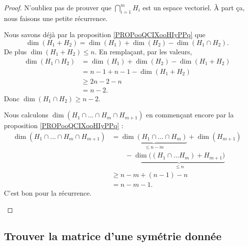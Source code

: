 \begin{proof}
	N'oubliez pas de prouver que \( \bigcap_{i=1}^mH_i\) est un espace vectoriel. À part ça, nous faisons une petite récurrence.
	\begin{subproof}
		\spitem[Pour \( m=2\)]
		Nous savons déjà par la proposition \ref{PROPooQCIXooHIyPPq} que
		\begin{equation}
			\dim(H_1 + H_2)=\dim(H_1)+\dim(H_2)-\dim(H_1\cap H_2).
		\end{equation}
		De plus \( \dim(H_1+H_2)\leq n\). En remplaçant, par les valeurs,
		\begin{subequations}
			\begin{align}
				\dim(H_1\cap H_2) & =\dim(H_1)+\dim(H_2)-\dim(H_1+ H_2) \\
				                  & =n-1+n-1-\dim(H_1+H_2)              \\
				                  & \geq 2n-2-n                         \\
				                  & =n-2.
			\end{align}
		\end{subequations}
		Donc \( \dim(H_1\cap H_2)\geq n-2\).

		\spitem[La récurrence]
		Nous calculons \( \dim(H_1\cap\ldots\cap H_m\cap H_{m+1})\) en commençant encore par la proposition \ref{PROPooQCIXooHIyPPq} :
		\begin{subequations}
			\begin{align}
				\dim(H_1\cap \ldots\cap H_m\cap H_{m+1}) & =\underbrace{\dim(H_1\cap\ldots\cap H_m)}_{\leq n-m}+\dim(H_{m+1})        \\
				                                         & \qquad -\underbrace{\dim\big( (H_1\cap\ldots H_m)+H_{m+1} \big)}_{\leq n} \\
				                                         & \geq n-m+(n-1)-n                                                          \\
				                                         & =n-m-1.
			\end{align}
		\end{subequations}
		C'est bon pour la récurrence.
	\end{subproof}
\end{proof}

\subsection{Trouver la matrice d'une symétrie donnée}
\label{SubSecMtrSym}

